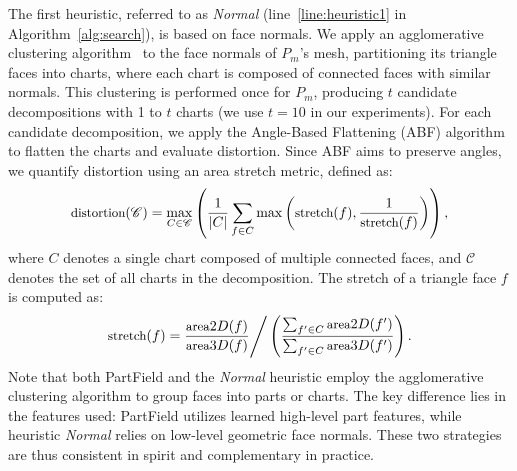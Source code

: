 The first heuristic, referred to as \emph{Normal} (line~\ref{line:heuristic1} in Algorithm~\ref{alg:search}), is based on face normals. We apply an agglomerative clustering algorithm~\cite{johnson1967hierarchical} to the face normals of $P_m$'s mesh, partitioning its triangle faces into charts, where each chart is composed of connected faces with similar normals. This clustering is performed once for $P_m$, producing $t$ candidate decompositions with 1 to $t$ charts (we use $t=10$ in our experiments). For each candidate decomposition, we apply the Angle-Based Flattening (ABF) algorithm to flatten the charts and evaluate distortion. Since ABF aims to preserve angles, we quantify distortion using an area stretch metric, defined as:
\vspace{-0.3em}
\begin{equation}
\label{equ:distortion}
\small
\text{distortion}(\mathscr{C}) = \max_{C \in \mathscr{C}} \left( \frac{1}{|C|} \sum_{f \in C} \max\left( \text{stretch}(f), \frac{1}{\text{stretch}(f)} \right) \right),
\end{equation}
\vspace{-0.3em}
where $C$ denotes a single chart composed of multiple connected faces, and $\mathscr{C}$ denotes the set of all charts in the decomposition. The stretch of a triangle face $f$ is computed as:
\vspace{-0.4em}
\begin{equation}
\small
\text{stretch}(f) = \frac{\text{area}{2D}(f)}{\text{area}{3D}(f)} \Bigg/ \left( \frac{\sum_{f' \in C} \text{area}{2D}(f')}{\sum_{f' \in C} \text{area}{3D}(f')} \right).
\end{equation}
Note that both PartField and the \emph{Normal} heuristic employ the agglomerative clustering algorithm to group faces into parts or charts. The key difference lies in the features used: PartField utilizes learned high-level part features, while heuristic \emph{Normal} relies on low-level geometric face normals. These two strategies are thus consistent in spirit and complementary in practice.

